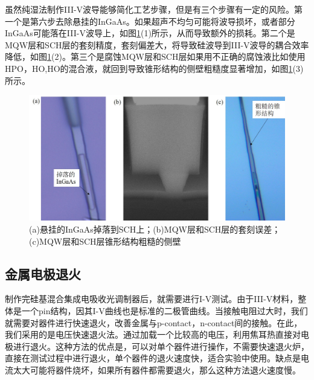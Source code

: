 虽然纯湿法制作III-V波导能够简化工艺步骤，但是有三个步骤有一定的风险。第一个是第六步去除悬挂的InGaAs。如果超声不均匀可能将波导损坏，或者部分InGaAs可能落在III-V波导上，如图\ref{chapt4_III_V_wrong_results}(1)所示，从而导致额外的损耗。第二个是MQW层和SCH层的套刻精度，套刻偏差大，将导致硅波导到III-V波导的耦合效率降低，如图\ref{chapt4_III_V_wrong_results}(2)。第三个是腐蚀MQW层和SCH层如果用不正确的腐蚀液比如使用HPO，HO,HO的混合液，就回到导致锥形结构的侧壁粗糙度显著增加，如图\ref{chapt4_III_V_wrong_results}(3)所示。
\begin{figure}[htb]
	\centering
	\includegraphics[width=14cm]{./Pictures/chapt4_III_V_wrong_results.jpg}
	\caption{(a)悬挂的InGaAs掉落到SCH上；(b)MQW层和SCH层的套刻误差；(c)MQW层和SCH层锥形结构粗糙的侧壁}
	\label{chapt4_III_V_wrong_results}
\end{figure}

\subsection{金属电极退火}
制作完硅基混合集成电吸收光调制器后，就需要进行I-V测试。由于III-V材料，整体是一个pin结构，因其I-V曲线也是标准的二极管曲线。当接触电阻过大时，我们就需要对器件进行快速退火，改善金属与p-contact，n-contact间的接触。在此，我们采用的是电压快速退火法。通过加载一个比较高的电压，利用焦耳热直接对电极进行退火。这种方法的优点是，可以对单个器件进行操作，不需要快速退火炉，直接在测试过程中进行退火，单个器件的退火速度快，适合实验中使用。缺点是电流太大可能将器件烧坏，如果所有器件都需要退火，那么这种方法退火速度慢。


